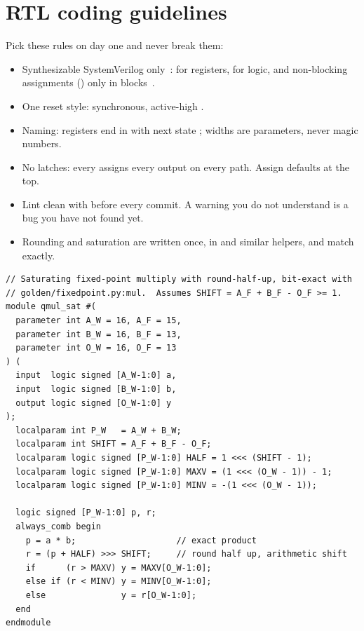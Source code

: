 \section{RTL coding guidelines}\label{sec:rtl:style}

Pick these rules on day one and never break them:
\begin{itemize}
  \item Synthesizable SystemVerilog only~\cite{sutherland2006svdesign}:
         for registers,  for logic, and
        non-blocking assignments (\code{<=}) only in 
        blocks~\cite{cummings2000nonblocking}.
  \item One reset style: synchronous, active-high .
  \item Naming: registers end in  with next state ; widths are
        parameters, never magic numbers.
  \item No latches: every  assigns every output on every
        path. Assign defaults at the top.
  \item Lint clean with  before every commit.
        A warning you do not understand is a bug you have not found yet.
  \item Rounding and saturation are written once, in  and
        similar helpers, and match  exactly.
\end{itemize}

\begin{lstlisting}[style=sv,caption={\texttt{qmul\_sat}: the hardware twin of \texttt{fixedpoint.mul}.},label={lst:rtl:qmul}]
// Saturating fixed-point multiply with round-half-up, bit-exact with
// golden/fixedpoint.py:mul.  Assumes SHIFT = A_F + B_F - O_F >= 1.
module qmul_sat #(
  parameter int A_W = 16, A_F = 15,
  parameter int B_W = 16, B_F = 13,
  parameter int O_W = 16, O_F = 13
) (
  input  logic signed [A_W-1:0] a,
  input  logic signed [B_W-1:0] b,
  output logic signed [O_W-1:0] y
);
  localparam int P_W   = A_W + B_W;
  localparam int SHIFT = A_F + B_F - O_F;
  localparam logic signed [P_W-1:0] HALF = 1 <<< (SHIFT - 1);
  localparam logic signed [P_W-1:0] MAXV = (1 <<< (O_W - 1)) - 1;
  localparam logic signed [P_W-1:0] MINV = -(1 <<< (O_W - 1));

  logic signed [P_W-1:0] p, r;
  always_comb begin
    p = a * b;                    // exact product
    r = (p + HALF) >>> SHIFT;     // round half up, arithmetic shift
    if      (r > MAXV) y = MAXV[O_W-1:0];
    else if (r < MINV) y = MINV[O_W-1:0];
    else               y = r[O_W-1:0];
  end
endmodule
\end{lstlisting}

